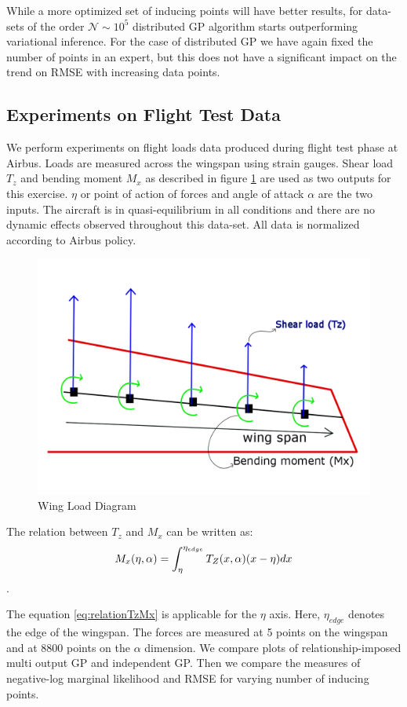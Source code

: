 While a more optimized set of inducing points will have better results, for data-sets of the order $\mathcal{N} \sim 10^5$ distributed GP algorithm starts outperforming variational inference. For the case of distributed GP we have again fixed the number of points in an expert, but this does not have a significant impact on the trend on RMSE with increasing data points. 

\subsection{Experiments on Flight Test Data}\label{subsec:expFlightLoadsData}
We perform experiments on flight loads data produced during flight test phase at Airbus. Loads are measured across the wingspan using strain gauges. Shear load \(T_{z}\) and bending moment \(M_{x}\) as described in figure \ref{fig:wingLoadDiagram} are used as two outputs for this exercise. \(\eta\) or point of action of forces and angle of attack \(\alpha\) are the two inputs. The aircraft is in quasi-equilibrium in all conditions and there are no dynamic effects observed throughout this data-set. All data is normalized according to Airbus policy.

\begin{figure}
\centering
\includegraphics[width=0.5\columnwidth]{images/part3/wingLoadDiagram.png}
\caption{Wing Load Diagram}
\label{fig:wingLoadDiagram}
\end{figure}


The relation between \(T_{z}\) and \(M_{x}\) can be written as:
\begin{equation}\label{eq:relationTzMx}
\centering
M_{x}(\eta, \alpha) = \int_{\eta}^{\eta_{edge}} T_{Z}(x, \alpha)(x-\eta)dx
\end{equation}.

The equation \ref{eq:relationTzMx} is applicable for the \(\eta\) axis. Here, \(\eta_{edge}\) denotes the edge of the wingspan. The forces are measured at 5 points on the wingspan and at 8800 points on the \(\alpha\) dimension. We compare plots of relationship-imposed multi output GP and independent GP. Then we compare the measures of negative-log marginal likelihood and RMSE for varying number of inducing points.

